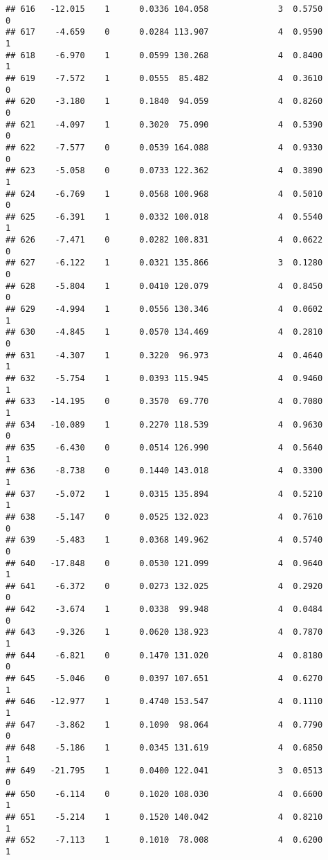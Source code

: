 \documentclass[
]{article}
\begin{document}
\begin{verbatim}
## 616   -12.015    1      0.0336 104.058              3  0.5750      0
## 617    -4.659    0      0.0284 113.907              4  0.9590      1
## 618    -6.970    1      0.0599 130.268              4  0.8400      1
## 619    -7.572    1      0.0555  85.482              4  0.3610      0
## 620    -3.180    1      0.1840  94.059              4  0.8260      0
## 621    -4.097    1      0.3020  75.090              4  0.5390      0
## 622    -7.577    0      0.0539 164.088              4  0.9330      0
## 623    -5.058    0      0.0733 122.362              4  0.3890      1
## 624    -6.769    1      0.0568 100.968              4  0.5010      0
## 625    -6.391    1      0.0332 100.018              4  0.5540      1
## 626    -7.471    0      0.0282 100.831              4  0.0622      0
## 627    -6.122    1      0.0321 135.866              3  0.1280      0
## 628    -5.804    1      0.0410 120.079              4  0.8450      0
## 629    -4.994    1      0.0556 130.346              4  0.0602      1
## 630    -4.845    1      0.0570 134.469              4  0.2810      0
## 631    -4.307    1      0.3220  96.973              4  0.4640      1
## 632    -5.754    1      0.0393 115.945              4  0.9460      1
## 633   -14.195    0      0.3570  69.770              4  0.7080      1
## 634   -10.089    1      0.2270 118.539              4  0.9630      0
## 635    -6.430    0      0.0514 126.990              4  0.5640      1
## 636    -8.738    0      0.1440 143.018              4  0.3300      1
## 637    -5.072    1      0.0315 135.894              4  0.5210      1
## 638    -5.147    0      0.0525 132.023              4  0.7610      0
## 639    -5.483    1      0.0368 149.962              4  0.5740      0
## 640   -17.848    0      0.0530 121.099              4  0.9640      1
## 641    -6.372    0      0.0273 132.025              4  0.2920      0
## 642    -3.674    1      0.0338  99.948              4  0.0484      0
## 643    -9.326    1      0.0620 138.923              4  0.7870      1
## 644    -6.821    0      0.1470 131.020              4  0.8180      0
## 645    -5.046    0      0.0397 107.651              4  0.6270      1
## 646   -12.977    1      0.4740 153.547              4  0.1110      1
## 647    -3.862    1      0.1090  98.064              4  0.7790      0
## 648    -5.186    1      0.0345 131.619              4  0.6850      1
## 649   -21.795    1      0.0400 122.041              3  0.0513      0
## 650    -6.114    0      0.1020 108.030              4  0.6600      1
## 651    -5.214    1      0.1520 140.042              4  0.8210      1
## 652    -7.113    1      0.1010  78.008              4  0.6200      1

\end{verbatim}
\end{document}
